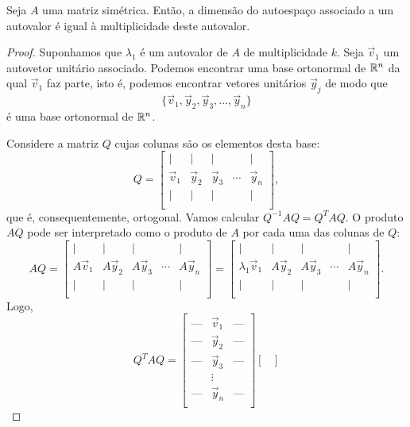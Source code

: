 \documentclass[../livro.tex]{subfiles}
\begin{document}
\begin{proposition}\label{dimens}
	Seja $A$ uma matriz simétrica. Então, a dimensão do autoespaço associado a um autovalor é igual à multiplicidade deste autovalor.
\end{proposition}

\begin{proof}
	Suponhamos que $\lambda_1$ é um autovalor de $A$ de multiplicidade $k$. Seja $\vec{v}_1$ um autovetor unitário associado. Podemos encontrar uma base ortonormal de $\mathbb{R}^n$ da qual $\vec{v}_1$ faz parte, isto é, podemos encontrar vetores unitários $\vec{y}_j$ de modo que
	\[
	\{ \vec{v}_1, \vec{y}_2, \vec{y}_3, \dots, \vec{y}_n \}
	\] é uma base ortonormal de $\mathbb{R}^n$.
	
	Considere a matriz $Q$ cujas colunas são os elementos desta base:
	\[
	Q = 
	\begin{bmatrix}
	| & | & | & & | \\
	\vec{v}_1 & \vec{y}_2 & \vec{y}_3 & \cdots &  \vec{y}_n \\
	| & | & | & & | \\
	\end{bmatrix},
	\] que é, consequentemente, ortogonal. Vamos calcular $Q^{-1} A Q = Q^T A Q$. O produto $AQ$ pode ser interpretado como o produto de $A$ por cada uma das colunas de $Q$:
	\[
	AQ = 
	\begin{bmatrix}
	| & | & | & & | \\
	A \vec{v}_1 & A \vec{y}_2 & A \vec{y}_3 & \cdots &  A\vec{y}_n \\
	| & | & | & & | \\
	\end{bmatrix} = 
	\begin{bmatrix}
	| & | & | & & | \\
	\lambda_1 \vec{v}_1 & A \vec{y}_2 & A \vec{y}_3 & \cdots &  A\vec{y}_n \\
	| & | & | & & | \\
	\end{bmatrix}.
	\] Logo,
	\[
	Q^TAQ =
	\begin{bmatrix}
	\text{---} & \vec{v}_1 & \text{---} \\
	\text{---} & \vec{y}_2 & \text{---} \\
	\text{---} & \vec{y}_3 &\text{---} \\
	& \vdots    &     \\
	\text{---} & \vec{y}_n & \text{---} \\      
	\end{bmatrix}
	\begin{bmatrix}

\end{bmatrix}\]
\end{proof}
\end{document}
